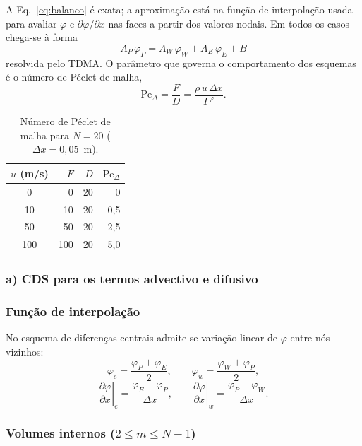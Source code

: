 A Eq.~\eqref{eq:balanco} é exata; a aproximação está na função de interpolação
usada para avaliar $\varphi$ e $\partial\varphi/\partial x$ nas faces a partir
dos valores nodais. Em todos os casos chega-se à forma
\begin{equation}
  \boxed{\;A_P\,\varphi_P=A_W\,\varphi_W+A_E\,\varphi_E+B\;}
  \label{eq:geral}
\end{equation}
resolvida pelo TDMA. O parâmetro que governa o comportamento dos esquemas é o
número de Péclet de malha,
\[
  \mathrm{Pe}_{\Delta}=\frac{F}{D}=\frac{\rho\,u\,\Delta x}{\Gamma^{\varphi}} .
\]

\begin{table}[H]
\centering
\caption{Número de Péclet de malha para $N=20$ ($\Delta x=0{,}05$~m).}
\begin{tabular}{crrr}
\hline
$u$ (m/s) & $F$ & $D$ & $\mathrm{Pe}_{\Delta}$\\
\hline
0   & 0   & 20 & 0\\
10  & 10  & 20 & 0,5\\
50  & 50  & 20 & 2,5\\
100 & 100 & 20 & 5,0\\
\hline
\end{tabular}
\end{table}

\vspace{0.5cm}

\subsubsection*{a) CDS para os termos advectivo e difusivo}

\subsubsection*{Função de interpolação}

No esquema de diferenças centrais admite-se variação linear de $\varphi$ entre
nós vizinhos:
\[
  \varphi_e=\frac{\varphi_P+\varphi_E}{2},\qquad
  \varphi_w=\frac{\varphi_W+\varphi_P}{2},
\]
\[
  \left.\frac{\partial\varphi}{\partial x}\right|_e=\frac{\varphi_E-\varphi_P}{\Delta x},\qquad
  \left.\frac{\partial\varphi}{\partial x}\right|_w=\frac{\varphi_P-\varphi_W}{\Delta x}.
\]

\subsubsection*{Volumes internos ($2\le m\le N-1$)}

